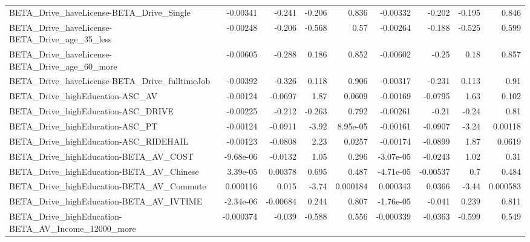 \begin{tabular}{lrrrrrrrr}
BETA\_Drive\_haveLicense-BETA\_Drive\_Single           &    -0.00341 &       -0.241 &   -0.206 &    0.836 &   -0.00332 &      -0.202 &       -0.195 &         0.846 \\
BETA\_Drive\_haveLicense-BETA\_Drive\_age\_35\_less      &    -0.00248 &       -0.206 &   -0.568 &     0.57 &   -0.00264 &      -0.188 &       -0.525 &         0.599 \\
BETA\_Drive\_haveLicense-BETA\_Drive\_age\_60\_more      &    -0.00605 &       -0.288 &    0.186 &    0.852 &   -0.00602 &       -0.25 &         0.18 &         0.857 \\
BETA\_Drive\_haveLicense-BETA\_Drive\_fulltimeJob      &    -0.00392 &       -0.326 &    0.118 &    0.906 &   -0.00317 &      -0.231 &        0.113 &          0.91 \\
BETA\_Drive\_highEducation-ASC\_AV                    &    -0.00124 &      -0.0697 &     1.87 &   0.0609 &   -0.00169 &     -0.0795 &         1.63 &         0.102 \\
BETA\_Drive\_highEducation-ASC\_DRIVE                 &    -0.00225 &       -0.212 &   -0.263 &    0.792 &   -0.00261 &       -0.21 &        -0.24 &          0.81 \\
BETA\_Drive\_highEducation-ASC\_PT                    &    -0.00124 &      -0.0911 &    -3.92 & 8.95e-05 &   -0.00161 &     -0.0907 &        -3.24 &       0.00118 \\
BETA\_Drive\_highEducation-ASC\_RIDEHAIL              &    -0.00123 &      -0.0808 &     2.23 &   0.0257 &   -0.00174 &     -0.0899 &         1.87 &        0.0619 \\
BETA\_Drive\_highEducation-BETA\_AV\_COST              &   -9.68e-06 &      -0.0132 &     1.05 &    0.296 &  -3.07e-05 &     -0.0243 &         1.02 &          0.31 \\
BETA\_Drive\_highEducation-BETA\_AV\_Chinese           &    3.39e-05 &      0.00378 &    0.695 &    0.487 &  -4.71e-05 &    -0.00537 &          0.7 &         0.484 \\
BETA\_Drive\_highEducation-BETA\_AV\_Commute           &    0.000116 &        0.015 &    -3.74 & 0.000184 &   0.000343 &      0.0366 &        -3.44 &      0.000583 \\
BETA\_Drive\_highEducation-BETA\_AV\_IVTIME            &   -2.34e-06 &     -0.00684 &    0.244 &    0.807 &  -1.76e-05 &      -0.041 &        0.239 &         0.811 \\
BETA\_Drive\_highEducation-BETA\_AV\_Income\_12000\_more &   -0.000374 &       -0.039 &   -0.588 &    0.556 &  -0.000339 &     -0.0363 &       -0.599 &         0.549 \\

\end{tabular}
